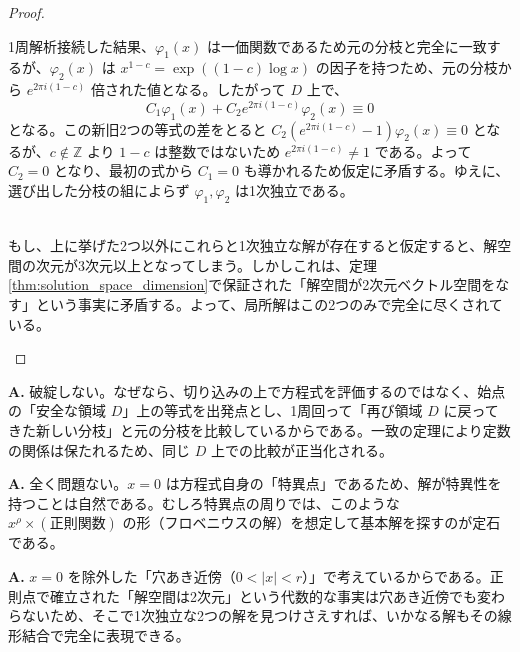 \begin{proof}
\begin{description}
        1周解析接続した結果、$\varphi_1(x)$ は一価関数であるため元の分枝と完全に一致するが、$\varphi_2(x)$ は $x^{1-c} = \exp((1-c)\log x)$ の因子を持つため、元の分枝から $e^{2\pi i(1-c)}$ 倍された値となる。したがって $D$ 上で、
        \[
        C_{1}\varphi_{1}(x)+C_{2}e^{2\pi i(1-c)}\varphi_{2}(x)\equiv 0
        \]
        となる。この新旧2つの等式の差をとると $C_2(e^{2\pi i(1-c)}-1)\varphi_2(x) \equiv 0$ となるが、$c \notin \mathbb{Z}$ より $1-c$ は整数ではないため $e^{2\pi i(1-c)} \neq 1$ である。よって $C_2=0$ となり、最初の式から $C_1=0$ も導かれるため仮定に矛盾する。ゆえに、選び出した分枝の組によらず $\varphi_1, \varphi_2$ は1次独立である。
        
        \item[【ステップ3】解がこれら2つで全てであること]\mbox{}\\
        もし、上に挙げた2つ以外にこれらと1次独立な解が存在すると仮定すると、解空間の次元が3次元以上となってしまう。しかしこれは、定理\ref{thm:solution_space_dimension}で保証された「解空間が2次元ベクトル空間をなす」という事実に矛盾する。よって、局所解はこの2つのみで完全に尽くされている。
    \end{description}
\end{proof}

\begin{Q}
\textbf{A.} 破綻しない。なぜなら、切り込みの上で方程式を評価するのではなく、始点の「安全な領域 $D$」上の等式を出発点とし、1周回って「再び領域 $D$ に戻ってきた新しい分枝」と元の分枝を比較しているからである。一致の定理により定数の関係は保たれるため、同じ $D$ 上での比較が正当化される。
\end{Q}

\begin{Q}[【核心】$\varphi_{2}(x)$ は $x=0$ で多価性や発散を伴うが、微分方程式の「解」として問題ないか？]
\textbf{A.} 全く問題ない。$x=0$ は方程式自身の「特異点」であるため、解が特異性を持つことは自然である。むしろ特異点の周りでは、このような $x^\rho \times (\text{正則関数})$ の形（フロベニウスの解）を想定して基本解を探すのが定石である。
\end{Q}

\begin{Q}[【核心】$x=0$ の真上ではコーシーの定理が使えないのに、なぜ解空間が「2次元」であり、この2つの解で「全て」だと断言できるのか？]
\textbf{A.} $x=0$ を除外した「穴あき近傍（$0 < |x| < r$）」で考えているからである。正則点で確立された「解空間は2次元」という代数的な事実は穴あき近傍でも変わらないため、そこで1次独立な2つの解を見つけさえすれば、いかなる解もその線形結合で完全に表現できる。
\end{Q}

